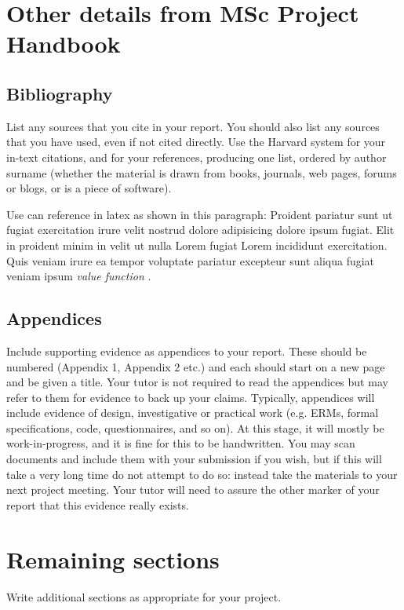\documentclass[a4paper, notitlepage, 11pt]{article}
\begin{document}
\section{Other details from MSc Project Handbook}

\subsection{Bibliography}

List any sources that you cite in your report. You should also list any sources that you have used, even if not cited directly. Use the Harvard system for your in-text citations, and for your references, producing one list, ordered by author surname (whether the material is drawn from books, journals, web pages, forums or blogs, or is a piece of software).

Use can reference in latex as shown in this paragraph: Proident pariatur sunt ut fugiat exercitation irure velit nostrud dolore adipisicing dolore ipsum fugiat. Elit in proident minim in velit ut nulla Lorem fugiat Lorem incididunt exercitation. Quis veniam irure ea tempor voluptate pariatur excepteur sunt aliqua fugiat veniam ipsum \emph{value function}  \citep{Sutton2018}.


\subsection{Appendices}

Include supporting evidence as appendices to your report. These should be numbered (Appendix 1, Appendix 2 etc.) and each should start on a new page and be given a title. Your tutor is not required to read the appendices but may refer to them for evidence to back up your claims. Typically, appendices will include evidence of design, investigative or practical work (e.g. ERMs, formal specifications, code, questionnaires, and so on). At this stage, it will mostly be work-in-progress, and it is fine for this to be handwritten. You may scan documents and include them with your submission if you wish, but if this will take a very long time do not attempt to do so: instead take the materials to your next project meeting. Your tutor will need to assure the other marker of your report that this evidence really exists.

\section{Remaining sections}
Write additional sections as appropriate for your project.







\clearpage
\appendix 
{}

\end{document}
